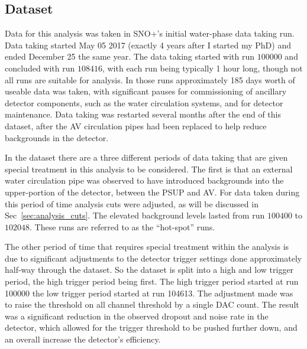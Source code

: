 \subsection{Dataset}
\label{sec:dataset}
Data for this analysis was taken in SNO+'s initial water-phase data taking
run.
Data taking started May 05 2017 (exactly 4 years after I
started my PhD) and ended December 25 the same year.
The data taking started with run $100000$ and concluded with run
$108416$, with each run being typically 1 hour long, though not
all runs are suitable for analysis.
In those runs approximately 185 days worth of useable data was taken,
with significant pauses for commissioning of ancillary detector components,
such as the water circulation systems, and for detector maintenance.
Data taking was restarted several months after the end of this dataset,
after the AV circulation pipes had been replaced to help reduce backgrounds
in the detector.

In the dataset there are a three different periods of data taking that are
given special treatment in this analysis
to be considered.
The first is that an external water circulation pipe was observed to have
introduced backgrounds into the upper-portion of the detector, between the
PSUP and AV\@.
For data taken during this period of time analysis cuts were adjusted, as
will be discussed in Sec~\ref{sec:analysis_cuts}.
The elevated background levels lasted from run $100400$ to $102048$.
These runs are referred to as the ``hot-spot'' runs.

The other period of time that requires special treatment within the analysis
is due to significant adjustments to the detector trigger settings done approximately
half-way through the dataset.
So the dataset is split into a high and low trigger period, the high trigger
period being first.
The high trigger period started at run 100000 the low trigger period started
at run 104613.
The adjustment made was to raise the threshold on all channel threshold
by a single DAC count.
The result was a significant reduction in the observed dropout and noise rate
in the detector, which allowed for the trigger threshold to be pushed further
down, and an overall increase the detector's efficiency.

